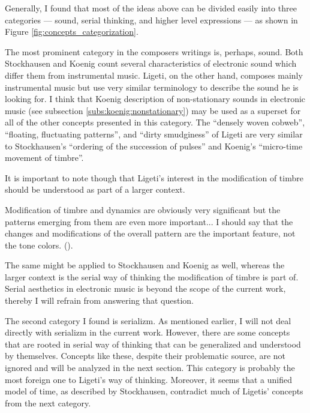 \documentclass[a4paper,11pt]{article}
\newenvironment{MyShadequote}[1][]{%
    \ignorespaces%
    \begin{mdframed}[style=MyShadeQuoteStyle,#1]%
}{%
    \end{mdframed}%
    \ignorespacesafterend%
}%
\begin{document}
Generally, I found that most of the ideas above can be divided easily into three categories --- sound, serial thinking, and higher level expressions --- as shown in Figure \ref{fig:concepts_categorization}.

The most prominent category in the composers writings is, perhaps, sound.
Both Stockhausen and Koenig count several characteristics of electronic sound which differ them from instrumental music.
Ligeti, on the other hand, composes mainly instrumental music but use very similar terminology to describe the sound he is looking for.
I think that Koenig description of non-stationary sounds in electronic music (see subsection \ref{subs:koenig:nonstationary}) may be used as a superset for all of the other concepts presented in this category.
The ``densely woven cobweb'', ``floating, fluctuating patterns'', and ``dirty smudginess'' of Ligeti are very similar to Stockhausen's ``ordering of the succession of pulses'' and Koenig's ``micro-time movement of timbre''.

It is important to note though that Ligeti's interest in the modification of timbre should be understood as part of a larger context.

\begin{MyShadequote}
  Modification of timbre and dynamics are obviously very significant but the patterns emerging from them are even more important...
  I should say that the changes and modifications of the overall pattern are the important feature, not the tone colors. (\cite[p. 39]{varnai}).
\end{MyShadequote}

The same might be applied to Stockhausen and Koenig as well, whereas the larger context is the serial way of thinking the modification of timbre is part of.
Serial aesthetics in electronic music is beyond the scope of the current work, thereby I will refrain from answering that question.

The second category I found is serializm.
As mentioned earlier, I will not deal directly with serializm in the current work.
However, there are some concepts that are rooted in serial way of thinking that can be generalized and understood by themselves.
Concepts like these, despite their problematic source, are not ignored and will be analyzed in the next section.
This category is probably the most foreign one to Ligeti's way of thinking.
Moreover, it seems that a unified model of time, as described by Stockhausen, contradict much of Ligetis' concepts from the next category.
\end{document}
